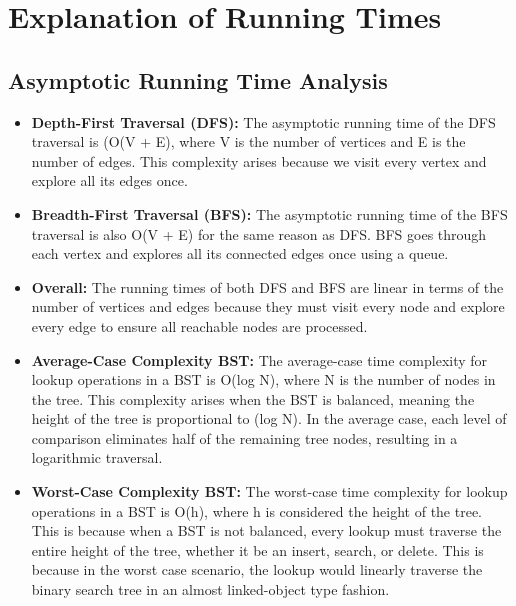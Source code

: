\documentclass{article}
\begin{document}
\section{Explanation of Running Times}


\subsection{Asymptotic Running Time Analysis}
\begin{itemize}
    \item \textbf{Depth-First Traversal (DFS):} The asymptotic running time of the DFS traversal is (O(V + E), where V is the number of vertices and E is the number of edges. This complexity arises because we visit every vertex and explore all its edges once.
    \item \textbf{Breadth-First Traversal (BFS):} The asymptotic running time of the BFS traversal is also O(V + E) for the same reason as DFS. BFS goes through each vertex and explores all its connected edges once using a queue.
    \item \textbf{Overall: }The running times of both DFS and BFS are linear in terms of the number of vertices and edges because they must visit every node and explore every edge to ensure all reachable nodes are processed.
    \item \textbf{Average-Case Complexity BST:} The average-case time complexity for lookup operations in a BST is O(log N), where N is the number of nodes in the tree. This complexity arises when the BST is balanced, meaning the height of the tree is proportional to (log N). In the average case, each level of comparison eliminates half of the remaining tree nodes, resulting in a logarithmic traversal.
    
    \item \textbf{Worst-Case Complexity BST:} The worst-case time complexity for lookup operations in a BST is O(h), where h is considered the height of the tree. This is because when a BST is not balanced, every lookup must traverse the entire height of the tree, whether it be an insert, search, or delete. This is because in the worst case scenario, the lookup would linearly traverse the binary search tree in an almost linked-object type fashion.
    
\end{itemize}
\end{document}
